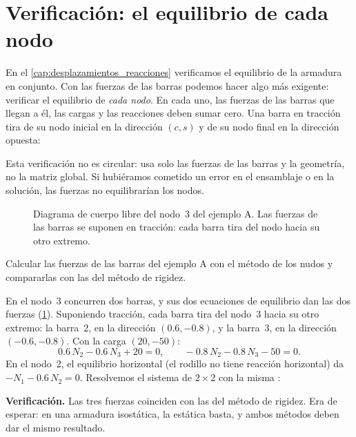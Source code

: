\section{Verificación: el equilibrio de cada nodo}\label{sec:equilibrio_nodal}

En el \cref{cap:desplazamientos_reacciones} verificamos el equilibrio de la
armadura en conjunto. Con las fuerzas de las barras podemos hacer algo más
exigente: verificar el equilibrio de \emph{cada nodo}. En cada uno, las
fuerzas de las barras que llegan a él, las cargas y las reacciones deben
sumar cero. Una barra en tracción tira de su nodo inicial en la dirección
$(c, s)$ y de su nodo final en la dirección opuesta:

Esta verificación no es circular: usa solo las fuerzas de las barras y la
geometría, no la matriz global. Si hubiéramos cometido un error en el
ensamblaje o en la solución, las fuerzas no equilibrarían los nodos.

\begin{figure}[ht]
  \centering
  \caption{Diagrama de cuerpo libre del nodo~3 del ejemplo A. Las fuerzas de
    las barras se suponen en tracción: cada barra tira del nodo hacia su otro
    extremo.}
  \label{fig:nudo_3}
\end{figure}

\begin{problemaresuelto}
Calcular las fuerzas de las barras del ejemplo A con el método de los nudos
y compararlas con las del método de rigidez.

\solucion
En el nodo~3 concurren dos barras, y sus dos ecuaciones de equilibrio dan
las dos fuerzas (\cref{fig:nudo_3}). Suponiendo tracción, cada barra tira del
nodo~3 hacia su otro extremo: la barra~2, en la dirección $(0.6, -0.8)$, y la
barra~3, en la dirección $(-0.6, -0.8)$. Con la carga $(20, -50)$:
\[
  0.6\,N_2 - 0.6\,N_3 + 20 = 0, \qquad
  -0.8\,N_2 - 0.8\,N_3 - 50 = 0.
\]
En el nodo~2, el equilibrio horizontal (el rodillo no tiene reacción
horizontal) da $-N_1 - 0.6\,N_2 = 0$. Resolvemos el sistema de $2\times2$ con
la misma :

\textbf{Verificación.} Las tres fuerzas coinciden con las del método de
rigidez. Era de esperar: en una armadura isostática, la estática basta, y
ambos métodos deben dar el mismo resultado.
\end{problemaresuelto}

